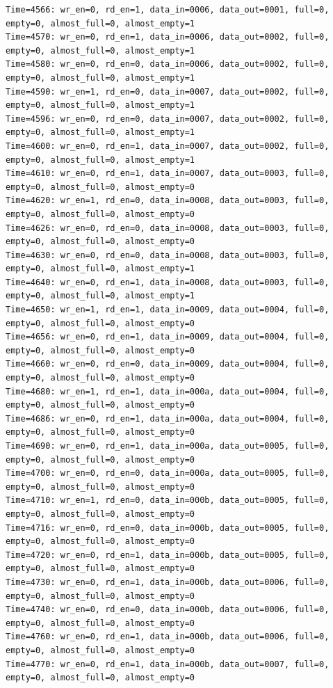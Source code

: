 \documentclass[UTF8]{ctexart}
\begin{document}
\begin{lstlisting}[frame=shadowbox]
Time=4566: wr_en=0, rd_en=1, data_in=0006, data_out=0001, full=0, empty=0, almost_full=0, almost_empty=1
Time=4570: wr_en=0, rd_en=1, data_in=0006, data_out=0002, full=0, empty=0, almost_full=0, almost_empty=1
Time=4580: wr_en=0, rd_en=0, data_in=0006, data_out=0002, full=0, empty=0, almost_full=0, almost_empty=1
Time=4590: wr_en=1, rd_en=0, data_in=0007, data_out=0002, full=0, empty=0, almost_full=0, almost_empty=1
Time=4596: wr_en=0, rd_en=0, data_in=0007, data_out=0002, full=0, empty=0, almost_full=0, almost_empty=1
Time=4600: wr_en=0, rd_en=1, data_in=0007, data_out=0002, full=0, empty=0, almost_full=0, almost_empty=1
Time=4610: wr_en=0, rd_en=1, data_in=0007, data_out=0003, full=0, empty=0, almost_full=0, almost_empty=0
Time=4620: wr_en=1, rd_en=0, data_in=0008, data_out=0003, full=0, empty=0, almost_full=0, almost_empty=0
Time=4626: wr_en=0, rd_en=0, data_in=0008, data_out=0003, full=0, empty=0, almost_full=0, almost_empty=0
Time=4630: wr_en=0, rd_en=0, data_in=0008, data_out=0003, full=0, empty=0, almost_full=0, almost_empty=1
Time=4640: wr_en=0, rd_en=1, data_in=0008, data_out=0003, full=0, empty=0, almost_full=0, almost_empty=1
Time=4650: wr_en=1, rd_en=1, data_in=0009, data_out=0004, full=0, empty=0, almost_full=0, almost_empty=0
Time=4656: wr_en=0, rd_en=1, data_in=0009, data_out=0004, full=0, empty=0, almost_full=0, almost_empty=0
Time=4660: wr_en=0, rd_en=0, data_in=0009, data_out=0004, full=0, empty=0, almost_full=0, almost_empty=0
Time=4680: wr_en=1, rd_en=1, data_in=000a, data_out=0004, full=0, empty=0, almost_full=0, almost_empty=0
Time=4686: wr_en=0, rd_en=1, data_in=000a, data_out=0004, full=0, empty=0, almost_full=0, almost_empty=0
Time=4690: wr_en=0, rd_en=1, data_in=000a, data_out=0005, full=0, empty=0, almost_full=0, almost_empty=0
Time=4700: wr_en=0, rd_en=0, data_in=000a, data_out=0005, full=0, empty=0, almost_full=0, almost_empty=0
Time=4710: wr_en=1, rd_en=0, data_in=000b, data_out=0005, full=0, empty=0, almost_full=0, almost_empty=0
Time=4716: wr_en=0, rd_en=0, data_in=000b, data_out=0005, full=0, empty=0, almost_full=0, almost_empty=0
Time=4720: wr_en=0, rd_en=1, data_in=000b, data_out=0005, full=0, empty=0, almost_full=0, almost_empty=0
Time=4730: wr_en=0, rd_en=1, data_in=000b, data_out=0006, full=0, empty=0, almost_full=0, almost_empty=0
Time=4740: wr_en=0, rd_en=0, data_in=000b, data_out=0006, full=0, empty=0, almost_full=0, almost_empty=0
Time=4760: wr_en=0, rd_en=1, data_in=000b, data_out=0006, full=0, empty=0, almost_full=0, almost_empty=0
Time=4770: wr_en=0, rd_en=1, data_in=000b, data_out=0007, full=0, empty=0, almost_full=0, almost_empty=0

\end{lstlisting}
\end{document}
